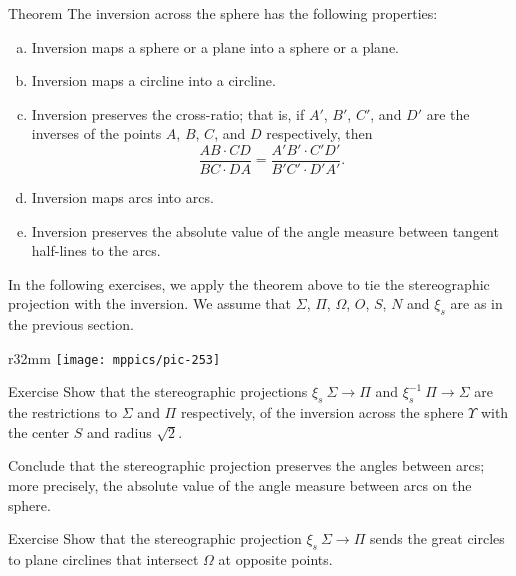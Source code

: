 \begin{thm}{Theorem}\label{thm:inversion-3d}
The inversion across the sphere has the following properties:
\begin{enumerate}[(a)]
\item\label{thm:inversion-3d:a} Inversion maps a sphere or a plane into a sphere or a plane.
\item\label{thm:inversion-3d:b} Inversion maps a circline into a circline. 
\item\label{thm:inversion-3d:cross-ratio} Inversion preserves the cross-ratio;
that is, if $A'$, $B'$, $C'$, and $D'$ are the inverses of the points $A$, $B$, $C$, and $D$ respectively,
then
$$\frac{AB\cdot CD}{BC\cdot DA}= \frac{A'B'\cdot C'D'}{B'C'\cdot D'A'}.$$
\item Inversion maps arcs into arcs.
\item\label{thm:inversion-3d:angle}
Inversion preserves the absolute value of the angle
measure between tangent half-lines to the arcs.
\end{enumerate}
\end{thm}

In the following exercises, we apply the theorem above to tie the stereographic projection with the inversion. 
We assume that $\Sigma$, $\Pi$, $\Omega$, $O$, $S$, $N$ and $\xi_s$ are as in the previous section.

{

\begin{wrapfigure}{r}{32mm}
\vskip-6mm
\centering
\texttt{[image: mppics/pic-253]}
\end{wrapfigure}

\begin{thm}{Exercise}\label{ex:stereographic-inversion}
Show that the stereographic projections 
$\xi_s\: \Sigma\to\Pi$ and $\xi^{-1}_s\: \Pi\to\Sigma$
are the restrictions to $\Sigma$ and $\Pi$ respectively, of the inversion across the sphere $\Upsilon$ with the center $S$ and radius $\sqrt{2}$.

Conclude that the stereographic projection preserves 
the angles between arcs;
more precisely, the absolute value of the angle measure between arcs on the sphere.
\end{thm}

\begin{thm}{Exercise}\label{ex:great-circ}
Show that the stereographic projection $\xi_s\:\Sigma\to\Pi$
sends the great circles to plane circlines that intersect $\Omega$ at opposite points.
\end{thm}

}

